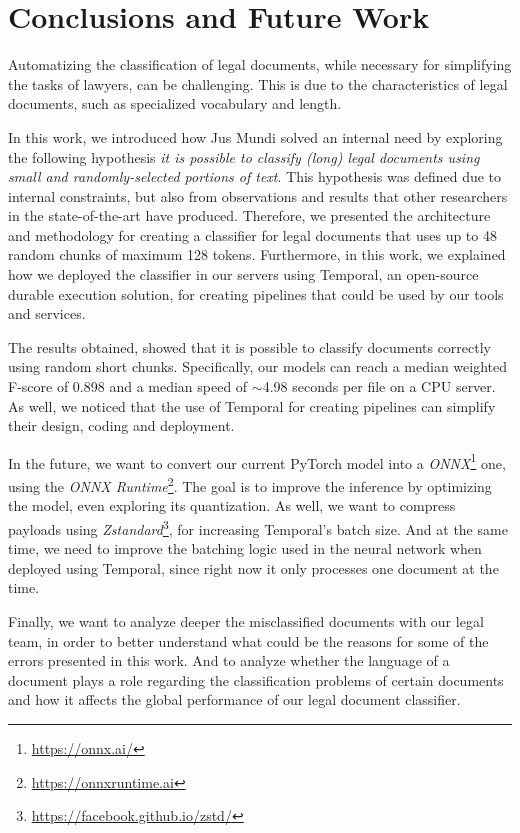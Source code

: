 \documentclass[11pt]{article}
\newcommand{\anonymize}[1]{#1}
\begin{document}
\section{Conclusions and Future Work}

    Automatizing the classification of legal documents, while necessary for simplifying the tasks of lawyers, can be challenging. This is due to the characteristics of legal documents, such as specialized vocabulary and length.

    In this work, we introduced how \anonymize{Jus Mundi} solved an internal need by exploring the following hypothesis \textit{it is possible to classify (long) legal documents using small and randomly-selected portions of text}. This hypothesis was defined due to internal constraints, but also from observations and results that other researchers in the state-of-the-art have produced. Therefore, we presented the architecture and methodology for creating a classifier for legal documents that uses up to 48 random chunks of maximum 128 tokens. Furthermore, in this work, we explained how we deployed the classifier in our servers using Temporal, an open-source durable execution solution, for creating pipelines that could be used by our tools and services.

    The results obtained, showed that it is possible to classify documents correctly using random short chunks. Specifically, our models  can reach a median weighted F-score of 0.898 and a median speed of $\sim$4.98 seconds per file on a CPU server. As well, we noticed that the use of Temporal for creating pipelines can simplify their design, coding and deployment.

    In the future, we want to convert our current PyTorch model into a \textit{ONNX}\footnote{\href{https://onnx.ai/}{https://onnx.ai/}} one, using the \textit{ONNX Runtime}\footnote{\href{https://onnxruntime.ai}{https://onnxruntime.ai}}. The goal is to improve the inference by optimizing the model, even exploring its quantization. As well, we want to compress payloads using \textit{Zstandard}\footnote{\href{https://facebook.github.io/zstd/}{https://facebook.github.io/zstd/}}, for increasing Temporal's batch size. And at the same time, we need to improve the batching logic used in the neural network when deployed using Temporal, since right now it only processes one document at the time.

    Finally, we want to analyze deeper the misclassified documents with our legal team, in order to better understand what could be the reasons for some of the errors presented in this work. And to analyze whether the language of a document plays a role regarding the classification problems of certain documents and how it affects the global performance of our legal document classifier.
\end{document}
